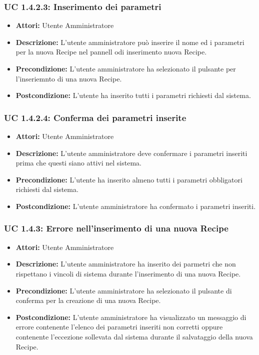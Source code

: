 \subsubsection{UC 1.4.2.3: Inserimento dei parametri}

\begin{itemize}
\item \textbf{Attori:} Utente Amministratore
\item \textbf{Descrizione:} L'utente amministratore può inserire il nome ed i parametri per la nuova Recipe nel pannell odi inserimento nuova Recipe.
\item \textbf{Precondizione:} L'utente amministratore ha selezionato il pulsante per l'inseriemnto di una nuova Recipe.
\item \textbf{Postcondizione:} L'utente ha inserito tutti i parametri richiesti dal sistema.
\end{itemize}

\subsubsection{UC 1.4.2.4: Conferma dei parametri inserite}

\begin{itemize}
\item \textbf{Attori:} Utente Amministratore
\item \textbf{Descrizione:} L'utente amministratore deve confermare i parametri inseriti prima che questi siano attivi nel sistema.
\item \textbf{Precondizione:} L'utente ha inserito almeno tutti i parametri obbligatori richiesti dal sistema.
\item \textbf{Postcondizione:} L'utente amministratore ha confermato i parametri inseriti.
\end{itemize}

\subsubsection{UC 1.4.3: Errore nell'inserimento di una nuova Recipe}

\begin{itemize}
\item \textbf{Attori:} Utente Amministratore
\item \textbf{Descrizione:} L'utente amministratore ha inserito dei parmetri che non rispettano i vincoli di sistema durante l'inserimento di una nuova Recipe.
\item \textbf{Precondizione:} L'utente amministratore ha selezionato il pulsante di conferma per la creazione di una nuova Recipe.
\item \textbf{Postcondizione:} L'utente amministratore ha visualizzato un messaggio di errore contenente l'elenco dei parametri inseriti non corretti oppure contenente l'eccezione sollevata dal sistema durante il salvataggio della nuova Recipe.
\end{itemize}

